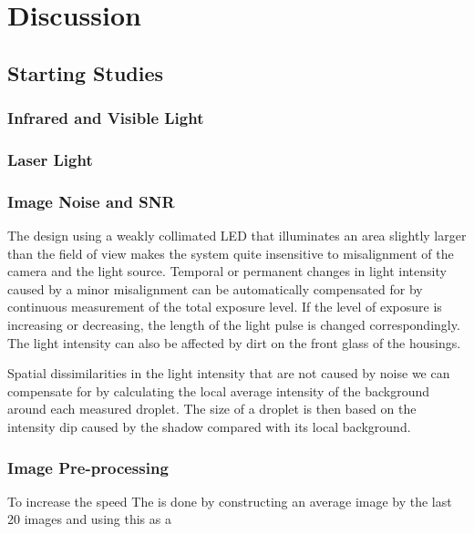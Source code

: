 
\chapter{Discussion}
\label{chap:discussion}



\section{Starting Studies}



\subsection{Infrared and Visible Light}


\subsection{Laser Light}

\subsection{Image Noise and SNR}

The design using a weakly collimated LED that illuminates an area slightly larger than the field of view makes the system quite insensitive to misalignment of the camera and the light source. Temporal or permanent changes in light intensity caused by a minor misalignment can be automatically compensated for by continuous measurement of the total exposure level. If the level of exposure is increasing or decreasing, the length of the light pulse is changed correspondingly. The light intensity can also be affected by dirt on the front glass of the housings. 

Spatial dissimilarities in the light intensity that are not caused by noise we can compensate for by calculating the local average intensity of the background around each measured droplet. The size of a droplet is then based on the intensity dip caused by the shadow compared with its local background.

\subsection{Image Pre-processing}

To increase the  speed The is done by constructing an average image by the last 20 images and using this as a 

